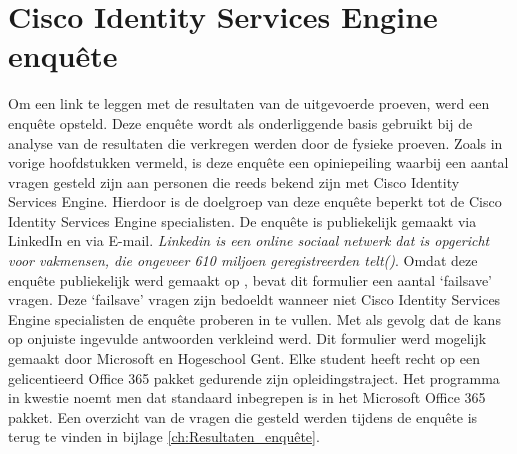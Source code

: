 \section{Cisco Identity Services Engine enquête}
\label{sec:enquête}
Om een link te leggen met de resultaten van de uitgevoerde proeven, werd een enquête opsteld. Deze enquête wordt als onderliggende basis gebruikt bij de analyse van de resultaten die verkregen werden door de fysieke proeven. Zoals in vorige hoofdstukken vermeld, is deze enquête een opiniepeiling waarbij een aantal vragen gesteld zijn aan personen die reeds bekend zijn met Cisco Identity Services Engine. Hierdoor is de doelgroep van deze enquête beperkt tot de Cisco Identity Services Engine specialisten.
\newline
\newline
De enquête is publiekelijk gemaakt via LinkedIn en via E-mail. \textit{Linkedin is een online sociaal netwerk dat is opgericht voor vakmensen, die ongeveer 610 miljoen geregistreerden telt(\cite{LinkedTIN})}. Omdat deze enquête publiekelijk werd gemaakt op \cite{LinkedIn}, bevat dit formulier een aantal ‘failsave’ vragen. Deze ‘failsave’ vragen zijn bedoeldt wanneer niet Cisco Identity Services Engine specialisten de enquête proberen in te vullen. Met als gevolg dat de kans op onjuiste ingevulde antwoorden verkleind werd.
\newline
\newline
Dit formulier werd mogelijk gemaakt door Microsoft en Hogeschool Gent. Elke student heeft recht op een gelicentieerd Office 365 pakket gedurende zijn opleidingstraject. Het programma in kwestie noemt men \cite{MicrosoftForms} dat standaard inbegrepen is in het Microsoft Office 365 pakket.
\newline
\newline
Een overzicht van de vragen die gesteld werden tijdens de enquête is terug te vinden in bijlage \ref{ch:Resultaten_enquête}.


